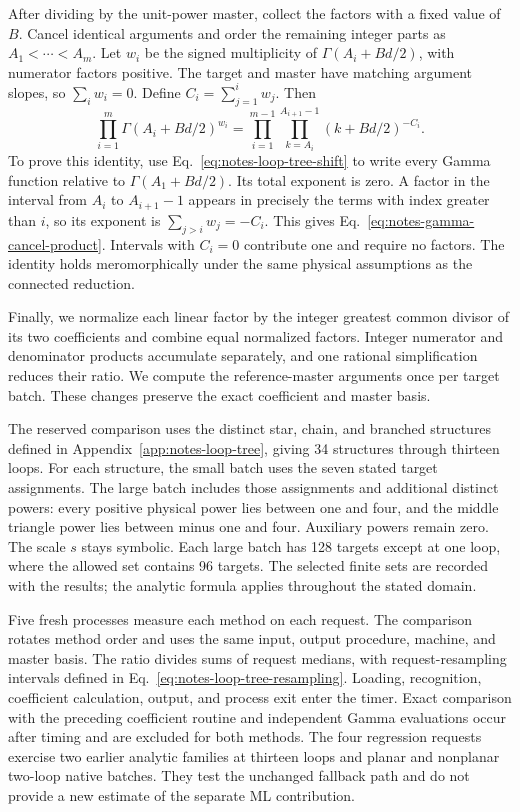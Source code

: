 After dividing by the unit-power master, collect the factors with a fixed value of $B$. Cancel identical arguments and order the remaining integer parts as $A_1<\cdots<A_m$. Let $w_i$ be the signed multiplicity of $\Gamma(A_i+Bd/2)$, with numerator factors positive. The target and master have matching argument slopes, so $\sum_i w_i=0$. Define $C_i=\sum_{j=1}^i w_j$. Then
\begin{equation}
 \prod_{i=1}^{m}\Gamma(A_i+Bd/2)^{w_i}
 =\prod_{i=1}^{m-1}\prod_{k=A_i}^{A_{i+1}-1}
       (k+Bd/2)^{-C_i}.
 \label{eq:notes-gamma-cancel-product}
\end{equation}
To prove this identity, use Eq.~\eqref{eq:notes-loop-tree-shift} to write every Gamma function relative to $\Gamma(A_1+Bd/2)$. Its total exponent is zero. A factor in the interval from $A_i$ to $A_{i+1}-1$ appears in precisely the terms with index greater than $i$, so its exponent is $\sum_{j>i}w_j=-C_i$. This gives Eq.~\eqref{eq:notes-gamma-cancel-product}. Intervals with $C_i=0$ contribute one and require no factors. The identity holds meromorphically under the same physical assumptions as the connected reduction.

Finally, we normalize each linear factor by the integer greatest common divisor of its two coefficients and combine equal normalized factors. Integer numerator and denominator products accumulate separately, and one rational simplification reduces their ratio. We compute the reference-master arguments once per target batch. These changes preserve the exact coefficient and master basis.

The reserved comparison uses the distinct star, chain, and branched structures defined in Appendix~\ref{app:notes-loop-tree}, giving 34 structures through thirteen loops. For each structure, the small batch uses the seven stated target assignments. The large batch includes those assignments and additional distinct powers: every positive physical power lies between one and four, and the middle triangle power lies between minus one and four. Auxiliary powers remain zero. The scale $s$ stays symbolic. Each large batch has 128 targets except at one loop, where the allowed set contains 96 targets. The selected finite sets are recorded with the results; the analytic formula applies throughout the stated domain.

Five fresh processes measure each method on each request. The comparison rotates method order and uses the same input, output procedure, machine, and master basis. The ratio divides sums of request medians, with request-resampling intervals defined in Eq.~\eqref{eq:notes-loop-tree-resampling}. Loading, recognition, coefficient calculation, output, and process exit enter the timer. Exact comparison with the preceding coefficient routine and independent Gamma evaluations occur after timing and are excluded for both methods. The four regression requests exercise two earlier analytic families at thirteen loops and planar and nonplanar two-loop native batches. They test the unchanged fallback path and do not provide a new estimate of the separate ML contribution.
